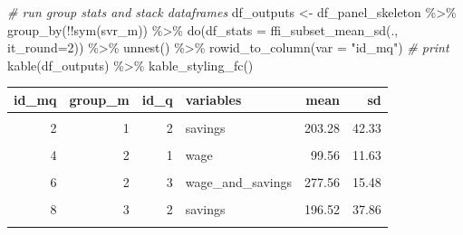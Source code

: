 \documentclass[
]{book}
\newenvironment{Shaded}{\begin{snugshade}}{\end{snugshade}}
\newcommand{\AttributeTok}[1]{\textcolor[rgb]{0.77,0.63,0.00}{#1}}
\newcommand{\CommentTok}[1]{\textcolor[rgb]{0.56,0.35,0.01}{\textit{#1}}}
\newcommand{\DecValTok}[1]{\textcolor[rgb]{0.00,0.00,0.81}{#1}}
\newcommand{\FunctionTok}[1]{\textcolor[rgb]{0.00,0.00,0.00}{#1}}
\newcommand{\NormalTok}[1]{#1}
\newcommand{\OtherTok}[1]{\textcolor[rgb]{0.56,0.35,0.01}{#1}}
\newcommand{\SpecialCharTok}[1]{\textcolor[rgb]{0.00,0.00,0.00}{#1}}
\newcommand{\StringTok}[1]{\textcolor[rgb]{0.31,0.60,0.02}{#1}}
\begin{document}
\begin{Shaded}
\begin{Highlighting}[]
\CommentTok{\# run group stats and stack dataframes}
\NormalTok{df\_outputs }\OtherTok{\textless{}{-}}\NormalTok{ df\_panel\_skeleton }\SpecialCharTok{\%\textgreater{}\%} \FunctionTok{group\_by}\NormalTok{(}\SpecialCharTok{!!}\FunctionTok{sym}\NormalTok{(svr\_m)) }\SpecialCharTok{\%\textgreater{}\%}
  \FunctionTok{do}\NormalTok{(}\AttributeTok{df\_stats =} \FunctionTok{ffi\_subset\_mean\_sd}\NormalTok{(., }\AttributeTok{it\_round=}\DecValTok{2}\NormalTok{)) }\SpecialCharTok{\%\textgreater{}\%}
  \FunctionTok{unnest}\NormalTok{() }\SpecialCharTok{\%\textgreater{}\%}
  \FunctionTok{rowid\_to\_column}\NormalTok{(}\AttributeTok{var =} \StringTok{"id\_mq"}\NormalTok{)}
\CommentTok{\# print}
\FunctionTok{kable}\NormalTok{(df\_outputs) }\SpecialCharTok{\%\textgreater{}\%} \FunctionTok{kable\_styling\_fc}\NormalTok{()}
\end{Highlighting}
\end{Shaded}

\begin{table}[!h]
\centering
\begin{tabular}{r|r|r|l|r|r}
\hline
id\_mq & group\_m & id\_q & variables & mean & sd\\
\hline
\cellcolor{gray!6}{1} & \cellcolor{gray!6}{1} & \cellcolor{gray!6}{1} & \cellcolor{gray!6}{wage} & \cellcolor{gray!6}{101.94} & \cellcolor{gray!6}{8.11}\\
\hline
2 & 1 & 2 & savings & 203.28 & 42.33\\
\hline
\cellcolor{gray!6}{3} & \cellcolor{gray!6}{1} & \cellcolor{gray!6}{3} & \cellcolor{gray!6}{wage\_and\_savings} & \cellcolor{gray!6}{305.22} & \cellcolor{gray!6}{34.83}\\
\hline
4 & 2 & 1 & wage & 99.56 & 11.63\\
\hline
\cellcolor{gray!6}{5} & \cellcolor{gray!6}{2} & \cellcolor{gray!6}{2} & \cellcolor{gray!6}{savings} & \cellcolor{gray!6}{178.01} & \cellcolor{gray!6}{10.34}\\
\hline
6 & 2 & 3 & wage\_and\_savings & 277.56 & 15.48\\
\hline
\cellcolor{gray!6}{7} & \cellcolor{gray!6}{3} & \cellcolor{gray!6}{1} & \cellcolor{gray!6}{wage} & \cellcolor{gray!6}{103.08} & \cellcolor{gray!6}{6.39}\\
\hline
8 & 3 & 2 & savings & 196.52 & 37.86\\
\hline
\cellcolor{gray!6}{9} & \cellcolor{gray!6}{3} & \cellcolor{gray!6}{3} & \cellcolor{gray!6}{wage\_and\_savings} & \cellcolor{gray!6}{299.60} & \cellcolor{gray!6}{33.50}\\
\hline
\end{tabular}
\end{table}
\end{document}
